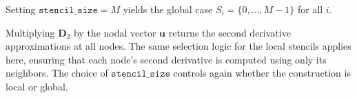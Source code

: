 Setting \(\texttt{stencil\_size}=M\) yields the global case \(S_i=\{0,\dots,M-1\}\) for all \(i\).

Multiplying \(\mathbf{D}_2\) by the nodal vector \(\mathbf{u}\) returns the
second derivative approximations at all nodes. The same selection logic for
the local stencils applies here, ensuring that each node's second derivative is computed
using only its neighbors. The choice of \(\texttt{stencil\_size}\) controls again whether the construction is local or global.
